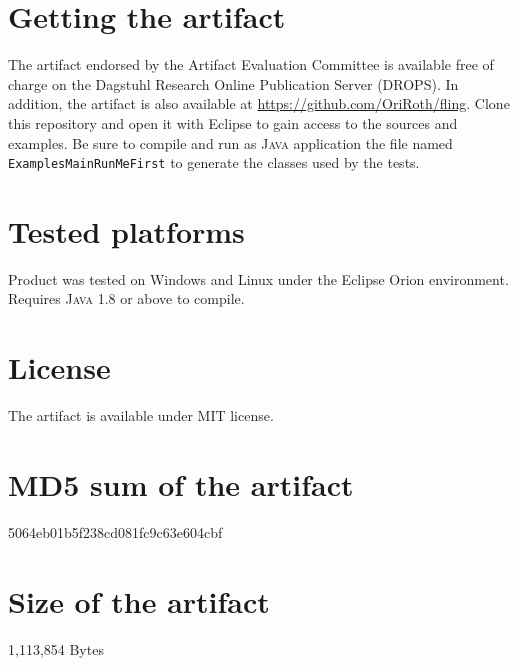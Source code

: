 \documentclass[a4paper,UKenglish,cleveref, autoref]{darts-v2019}
\newcommand{\Java}{\textsc{Java}\xspace}
\newenvironment{getting}{\section{Getting the artifact} The artifact 
	endorsed by the Artifact Evaluation Committee is available free of 
	charge on the Dagstuhl Research Online Publication Server (DROPS).}{}
\newenvironment{platforms}{\section{Tested platforms}}{}
\newcommand{\license}[1]{{\section{License}#1}}
\newcommand{\mdsum}[1]{{\section{MD5 sum of the artifact}#1}}
\newcommand{\artifactsize}[1]{{\section{Size of the artifact}#1}}
\begin{document}
\begin{getting}
	In addition, the artifact is also available at \url{https://github.com/OriRoth/fling}.
  Clone this repository and open it with Eclipse to gain access to the sources
  and examples.
  Be sure to compile and run as \Java application the file named \texttt{ExamplesMainRunMeFirst}
  to generate the classes used by the tests.
\end{getting}

\begin{platforms}
  Product was tested on Windows and Linux under the Eclipse Orion environment.
  Requires \Java 1.8 or above to compile.
\end{platforms}

\license{The artifact is available under MIT license.}

\mdsum{5064eb01b5f238cd081fc9c63e604cbf}

\artifactsize{1,113,854 Bytes}

\appendix


\end{document}
